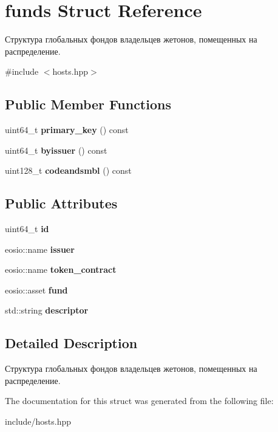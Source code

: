 \hypertarget{structfunds}{}\section{funds Struct Reference}
\label{structfunds}


Структура глобальных фондов владельцев жетонов, помещенных на распределение.  




{\ttfamily \#include $<$hosts.\+hpp$>$}

\subsection*{Public Member Functions}
\begin{DoxyCompactItemize}
\item 
\mbox{\label{structfunds_afdc3eb8e502cb03e6dacd48605ccc671}} 
uint64\+\_\+t {\bfseries primary\+\_\+key} () const
\item 
\mbox{\label{structfunds_a8b5c509d5fe2b1aef52afba800f29929}} 
uint64\+\_\+t {\bfseries byissuer} () const
\item 
\mbox{\label{structfunds_abdba3d22c4cde341d9bd7638462e65bd}} 
uint128\+\_\+t {\bfseries codeandsmbl} () const
\end{DoxyCompactItemize}
\subsection*{Public Attributes}
\begin{DoxyCompactItemize}
\item 
\mbox{\label{structfunds_a9739e08a3d3556a7f73552bcb370b213}} 
uint64\+\_\+t {\bfseries id}
\item 
\mbox{\label{structfunds_a539c18e111c5d748cec58b15e10ea0a8}} 
eosio\+::name {\bfseries issuer}
\item 
\mbox{\label{structfunds_a3ca4e48b1ef43580b0bb1d52d4ee1ca3}} 
eosio\+::name {\bfseries token\+\_\+contract}
\item 
\mbox{\label{structfunds_ae1327e44f67595f7bc0d30ee9d436d29}} 
eosio\+::asset {\bfseries fund}
\item 
\mbox{\label{structfunds_aeb379a7b45ab82e8961582b9e5fc6eae}} 
std\+::string {\bfseries descriptor}
\end{DoxyCompactItemize}


\subsection{Detailed Description}
Структура глобальных фондов владельцев жетонов, помещенных на распределение. 

The documentation for this struct was generated from the following file\+:\begin{DoxyCompactItemize}
\item 
include/hosts.\+hpp\end{DoxyCompactItemize}
